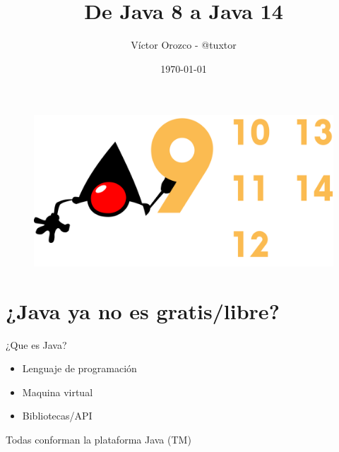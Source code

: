 \documentclass[aspectratio=169]{beamer}
\title{De Java 8 a Java 14}
\author{Víctor Orozco - @tuxtor}
\institute{Academik}
\date{\today}
\begin{document}
{
    \frame{\titlepage}
}


\begin{frame}
    \tableofcontents
\end{frame}

\begin{frame}[fragile]

    \begin{figure}
        \centering
        \includegraphics[width=\linewidth]{Images/versiones}
    \end{figure}

\end{frame}

\section{¿Java ya no es gratis/libre?}

\begin{frame}[fragile]{¿Que es Java?}
	\begin{itemize}
		\item Lenguaje de programación
		\item Maquina virtual
		\item Bibliotecas/API
	\end{itemize}

Todas conforman la plataforma Java \pause(TM)
	
\end{frame}
\end{document}
